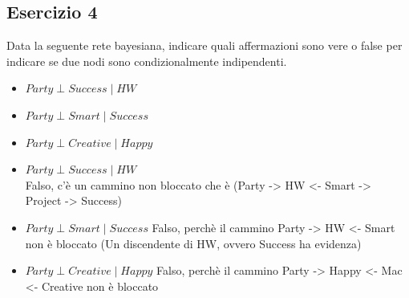 \documentclass{article}
\begin{document}
\pagebreak

\subsection{Esercizio 4}

Data la seguente rete bayesiana, indicare quali affermazioni sono vere o false per indicare se due nodi sono condizionalmente indipendenti.


\begin{center}
\end{center}

\begin{itemize}
	\item \(Party \; \bot \; Success \;|\; HW\)
	\item \(Party \; \bot \; Smart \;|\; Success\)
	\item \(Party \; \bot \; Creative \;|\; Happy \)
\end{itemize}

\vspace{0.4cm}
\begin{itemize}
	\item \(Party \; \bot \; Success \;|\; HW\) \\
	Falso, c'è un cammino non bloccato che è (Party -> HW <- Smart -> Project -> Success)
\end{itemize}

\begin{itemize}
	\item \(Party \; \bot \; Smart \;|\; Success\)
	Falso, perchè il cammino Party -> HW <- Smart non è bloccato (Un discendente di HW, ovvero Success ha evidenza)
\end{itemize}

\begin{itemize}
	\item \(Party \; \bot \; Creative \;|\; Happy \)
	Falso, perchè il cammino Party -> Happy <- Mac <- Creative  non è bloccato
\end{itemize}
\end{document}
